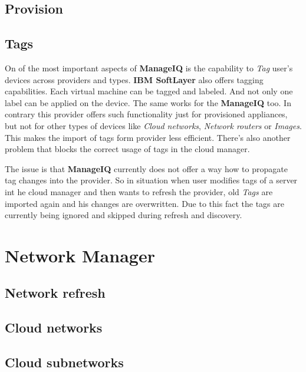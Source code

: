 \subsection{Provision}
\label{sub:Provision}

\subsection{Tags}
\label{sub:Tags}

On of the most important aspects of \textbf{ManageIQ} is the capability to \emph{Tag} user's devices across providers and types. \textbf{IBM SoftLayer} also offers tagging capabilities. Each virtual machine can be tagged and labeled. And not only one label can be applied on the device. The same works for the \textbf{ManageIQ} too. In contrary this provider offers such functionality just for provisioned appliances, but not for other types of devices like \emph{Cloud networks}, \emph{Network routers} or \emph{Images}. This makes the import of tags form provider less efficient. There's also another problem that blocks the correct usage of tags in the cloud manager.

The issue is that \textbf{ManageIQ} currently does not offer a way how to propagate tag changes into the provider. So in situation when user modifies tags of a server int he cloud manager and then wants to refresh the provider, old \emph{Tags} are imported again and his changes are overwritten. Due to this fact the tags are currently being ignored and skipped during refresh and discovery.

\section{Network Manager}
\label{sec:Network Manager}

\subsection{Network refresh}
\label{sub:Network refresh}

\subsection{Cloud networks}
\label{sub:Cloud networks}

\subsection{Cloud subnetworks}
\label{sub:Cloud subnetworks}

